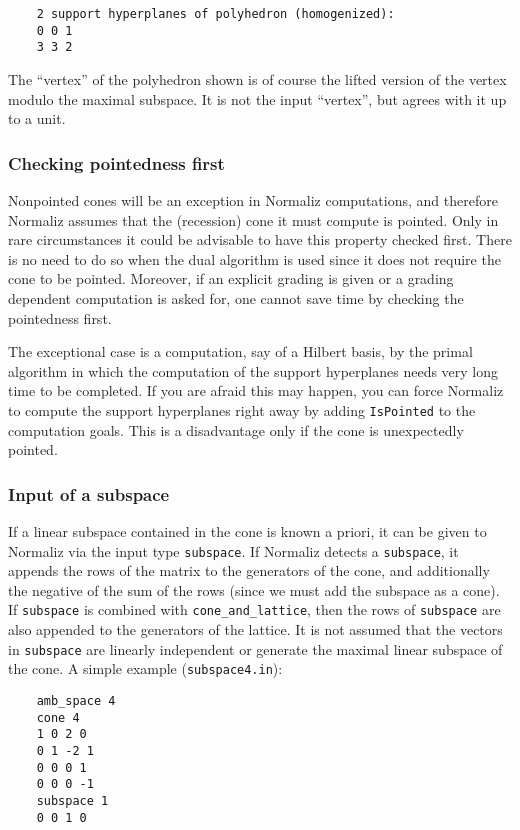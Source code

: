 \documentclass[12pt,a4paper]{scrartcl}
\theoremstyle{definition}
\begin{document}
{\begin{Verbatim}
	2 support hyperplanes of polyhedron (homogenized):
	0 0 1
	3 3 2
	\end{Verbatim}
	
	The ``vertex'' of the polyhedron shown is of course the lifted version of the vertex modulo the maximal subspace. It is not the input ``vertex'', but agrees with it up to a unit.
	
	\subsubsection{Checking pointedness first}\label{IsPointed}
	
	Nonpointed cones will be an exception in Normaliz computations, and therefore Normaliz assumes that the (recession) cone it must compute is pointed. Only in rare circumstances it could be advisable to have this property checked first. There is no need to do so when the dual algorithm is used since it does not require the cone to be pointed. Moreover, if an explicit grading is given or a grading dependent computation is asked for, one cannot save time by checking the pointedness first.
	
	The exceptional case is a computation, say of a Hilbert basis, by the primal algorithm in which the computation of the support hyperplanes needs very long time to be completed. If you are afraid this may happen, you can force Normaliz to compute the support hyperplanes right away by adding \verb|IsPointed| to the computation goals. This is a disadvantage only if the cone is unexpectedly pointed.
	
	\subsubsection{Input of a subspace} \label{subspace}
	
	If a linear subspace contained in the cone is known a priori, it can be given to Normaliz via the input type \verb|subspace|. If Normaliz detects a \verb|subspace|, it appends the rows of the matrix to the generators of the cone, and additionally the negative of the sum of the rows (since we must add the subspace as a cone). If \verb|subspace| is combined with \verb|cone_and_lattice|, then the rows of \verb|subspace| are also appended to the generators of the lattice. It is not assumed that the vectors in \verb|subspace| are linearly independent or generate the maximal linear subspace of the cone. A simple example (\verb|subspace4.in|):
	\begin{Verbatim}
	amb_space 4
	cone 4
	1 0 2 0
	0 1 -2 1
	0 0 0 1
	0 0 0 -1
	subspace 1
	0 0 1 0
	\end{Verbatim}
	
}
\end{document}
